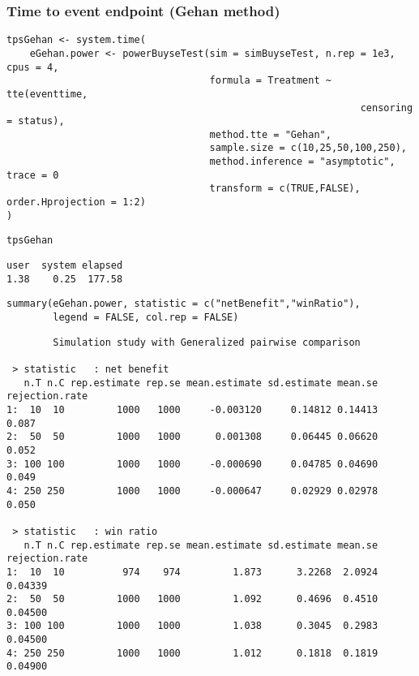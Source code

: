 \documentclass[12pt]{article}
\begin{document}
\clearpage

\subsubsection{Time to event endpoint (Gehan method)}
\label{sec:org455f214}
\lstset{language=r,label= ,caption= ,captionpos=b,numbers=none}
\begin{lstlisting}
tpsGehan <- system.time(
	eGehan.power <- powerBuyseTest(sim = simBuyseTest, n.rep = 1e3, cpus = 4,
								   formula = Treatment ~ tte(eventtime, 
															 censoring = status), 
								   method.tte = "Gehan",
								   sample.size = c(10,25,50,100,250), 
								   method.inference = "asymptotic", trace = 0
								   transform = c(TRUE,FALSE), order.Hprojection = 1:2)
)
\end{lstlisting}

\lstset{language=r,label= ,caption= ,captionpos=b,numbers=none}
\begin{lstlisting}
tpsGehan
\end{lstlisting}

\begin{verbatim}
user  system elapsed 
1.38    0.25  177.58
\end{verbatim}

\lstset{language=r,label= ,caption= ,captionpos=b,numbers=none}
\begin{lstlisting}
summary(eGehan.power, statistic = c("netBenefit","winRatio"), 
		legend = FALSE, col.rep = FALSE)
\end{lstlisting}

\begin{verbatim}
        Simulation study with Generalized pairwise comparison

 > statistic   : net benefit
   n.T n.C rep.estimate rep.se mean.estimate sd.estimate mean.se rejection.rate
1:  10  10         1000   1000     -0.003120     0.14812 0.14413          0.087
2:  50  50         1000   1000      0.001308     0.06445 0.06620          0.052
3: 100 100         1000   1000     -0.000690     0.04785 0.04690          0.049
4: 250 250         1000   1000     -0.000647     0.02929 0.02978          0.050

 > statistic   : win ratio
   n.T n.C rep.estimate rep.se mean.estimate sd.estimate mean.se rejection.rate
1:  10  10          974    974         1.873      3.2268  2.0924        0.04339
2:  50  50         1000   1000         1.092      0.4696  0.4510        0.04500
3: 100 100         1000   1000         1.038      0.3045  0.2983        0.04500
4: 250 250         1000   1000         1.012      0.1818  0.1819        0.04900
\end{verbatim}
\end{document}
